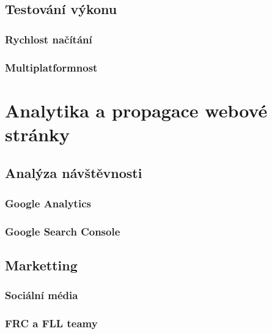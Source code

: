 \documentclass[a4paper, 12pt]{article}
\begin{document}
  \subsection{Testování výkonu}

  \subsubsection{Rychlost načítání}

  \subsubsection{Multiplatformnost}


  \section{Analytika a propagace webové stránky}

  \subsection{Analýza návštěvnosti}

  \subsubsection{Google Analytics}

  \subsubsection{Google Search Console}

  \subsection{Marketting}

  \subsubsection{Sociální média}

  \subsubsection{FRC a FLL teamy}
\end{document}
